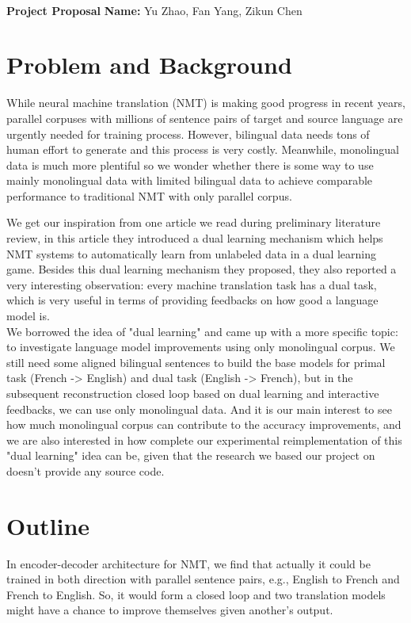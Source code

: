 \documentclass[11pt]{article}
\begin{document}
\\
{{\bf Project Proposal}} \hfill {{\bf Name:} Yu Zhao, Fan Yang, Zikun Chen} \\
\part{Problem and Background}
While neural machine translation (NMT) is making good progress in recent years, parallel corpuses with millions of sentence pairs of target and source language are urgently needed for training process. However, bilingual data needs tons of human effort to generate and this process is very costly. Meanwhile, monolingual data is much more plentiful so we wonder whether there is some way to use mainly monolingual data with limited bilingual data to achieve comparable performance to traditional NMT with only parallel corpus.


We get our inspiration from one article\cite{he2016dual} we read during preliminary literature review, in this article they introduced a dual learning mechanism which helps NMT systems to automatically learn from unlabeled data in a dual learning game. Besides this dual learning mechanism they proposed, they also reported a very interesting observation: every machine translation task has a dual task, which is very useful in terms of providing feedbacks on how good a language model is. 
\\
\indent We borrowed the idea of "dual learning" and came up with a more specific topic: to investigate language model improvements using only monolingual corpus. We still need some aligned bilingual sentences to build the base models for primal task (French -> English) and dual task (English -> French), but in the subsequent reconstruction closed loop based on dual learning and interactive feedbacks, we can use only monolingual data. And it is our main interest to see how much monolingual corpus can contribute to the accuracy improvements, and we are also interested in how complete our experimental reimplementation of this "dual learning" idea can be, given that the research we based our project on doesn't provide any source code.

\part{Outline}
In encoder-decoder architecture for NMT, we find that actually it could be trained in both direction with parallel sentence pairs, e.g., English to French and French to English. So, it would form a closed loop and two translation models might have a chance to improve themselves given another's output.
\end{document}
